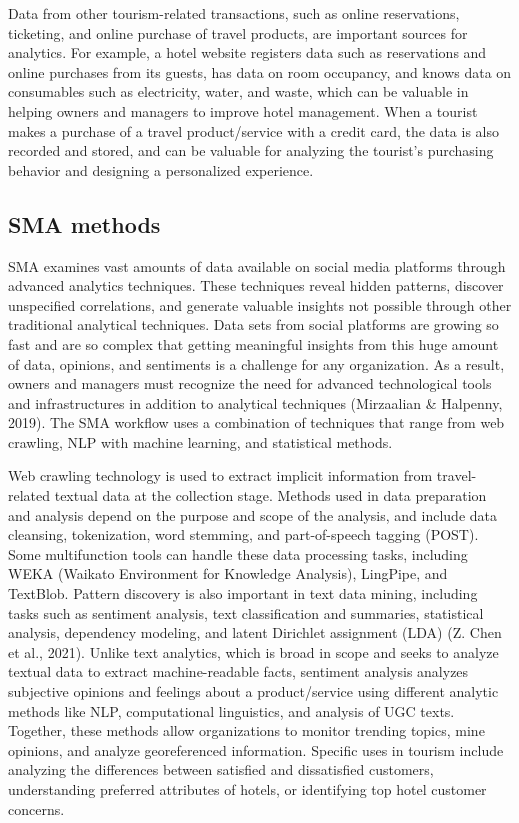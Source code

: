 \documentclass[
  letterpaper,
  DIV=11,
  numbers=noendperiod]{scrreprt}
\begin{document}
Data from other tourism-related transactions, such as online
reservations, ticketing, and online purchase of travel products, are
important sources for analytics. For example, a hotel website registers
data such as reservations and online purchases from its guests, has data
on room occupancy, and knows data on consumables such as electricity,
water, and waste, which can be valuable in helping owners and managers
to improve hotel management. When a tourist makes a purchase of a travel
product/service with a credit card, the data is also recorded and
stored, and can be valuable for analyzing the tourist's purchasing
behavior and designing a personalized experience.

\hypertarget{sma-methods}{%
\subsection{SMA methods}\label{sma-methods}}

SMA examines vast amounts of data available on social media platforms
through advanced analytics techniques. These techniques reveal hidden
patterns, discover unspecified correlations, and generate valuable
insights not possible through other traditional analytical techniques.
Data sets from social platforms are growing so fast and are so complex
that getting meaningful insights from this huge amount of data,
opinions, and sentiments is a challenge for any organization. As a
result, owners and managers must recognize the need for advanced
technological tools and infrastructures in addition to analytical
techniques (Mirzaalian \& Halpenny, 2019). The SMA workflow uses a
combination of techniques that range from web crawling, NLP with machine
learning, and statistical methods.

Web crawling technology is used to extract implicit information from
travel-related textual data at the collection stage. Methods used in
data preparation and analysis depend on the purpose and scope of the
analysis, and include data cleansing, tokenization, word stemming, and
part-of-speech tagging (POST). Some multifunction tools can handle these
data processing tasks, including WEKA (Waikato Environment for Knowledge
Analysis), LingPipe, and TextBlob. Pattern discovery is also important
in text data mining, including tasks such as sentiment analysis, text
classification and summaries, statistical analysis, dependency modeling,
and latent Dirichlet assignment (LDA) (Z. Chen et al., 2021). Unlike
text analytics, which is broad in scope and seeks to analyze textual
data to extract machine-readable facts, sentiment analysis analyzes
subjective opinions and feelings about a product/service using different
analytic methods like NLP, computational linguistics, and analysis of
UGC texts. Together, these methods allow organizations to monitor
trending topics, mine opinions, and analyze georeferenced information.
Specific uses in tourism include analyzing the differences between
satisfied and dissatisfied customers, understanding preferred attributes
of hotels, or identifying top hotel customer concerns.
\end{document}
